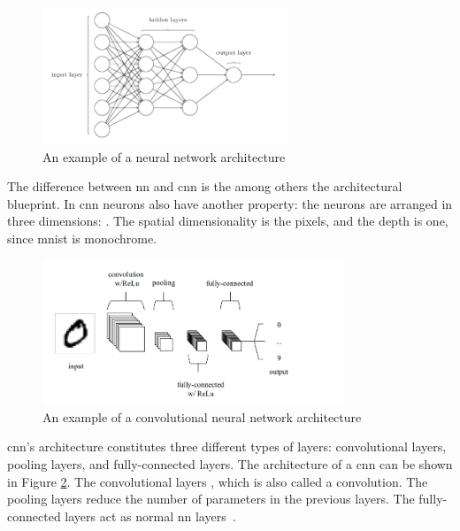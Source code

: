 \begin{figure}[htb!]
    \centering
    \includegraphics[width=0.65\textwidth]{figures/michael-nielsen-nn-architecture.png}
    \caption{An example of a neural network architecture~\cite{michael-nielsen-nn}}
    \label{fig:nn-example-architecture}
\end{figure}

The difference between \gls{nn} and \gls{cnn} is the among others the architectural blueprint. In \gls{cnn} neurons also have another property: the neurons are arranged in three dimensions: . The spatial dimensionality is the pixels, and the depth is one, since \gls{mnist} is monochrome.


\begin{figure}[htb!]
    \centering
    \includegraphics[width=0.8\textwidth]{figures/cnn-simple-architecture.png}
    \caption{An example of a convolutional neural network architecture~\cite{introduction-to-cnn}}
    \label{fig:simple-cnn-architecture}
\end{figure}

\gls{cnn}'s architecture constitutes three different types of layers: convolutional layers, pooling layers, and fully-connected layers. The architecture of a \gls{cnn} can be shown in Figure \ref{fig:simple-cnn-architecture}. The convolutional layers , which is also called a convolution. The pooling layers reduce the number of parameters in the previous layers. The fully-connected layers act as normal \gls{nn} layers~\cite{introduction-to-cnn}.


